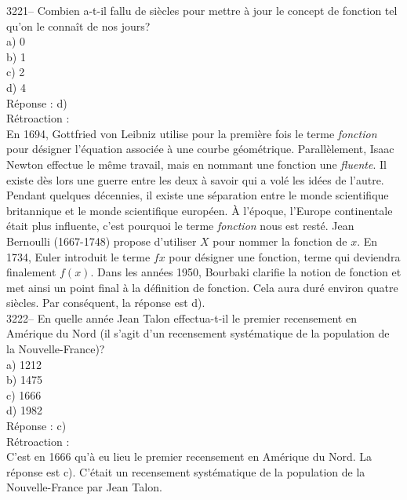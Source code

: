 \documentclass[letterpaper, 12pt]{article}
\begin{document}
3221-- Combien a-t-il fallu de si\`ecles pour mettre \`a jour le concept de fonction tel qu'on le conna\^it de nos jours?\\

a) 0\\
b) 1\\
c) 2\\
d) 4\\

R\'eponse : d)\\

R\'etroaction :\\
En 1694, Gottfried von Leibniz utilise pour la premi\`ere fois le terme \emph{fonction} pour d\'esigner l'\'equation associ\'ee \`a une courbe g\'eom\'etrique. Parall\`element, Isaac Newton effectue le m\^eme travail, mais en nommant une fonction une \emph{fluente}. Il existe d\`es lors une guerre entre les deux \`a savoir qui a vol\'e les id\'ees de l'autre. Pendant quelques d\'ecennies, il existe une s\'eparation entre le monde scientifique britannique et le monde scientifique europ\'een. \`A l'\'epoque, l'Europe continentale \'etait plus influente, c'est pourquoi le terme \emph{fonction} nous est rest\'e.  Jean Bernoulli (1667-1748) propose d'utiliser $X$ pour nommer la fonction de $x$. En 1734, Euler introduit le terme \emph{$fx$} pour d\'esigner une fonction, terme qui deviendra finalement $f(x)$. Dans les ann\'ees 1950, Bourbaki clarifie la notion de fonction et met ainsi un point final \`a la d\'efinition de fonction. Cela aura dur\'e environ quatre si\`ecles. Par cons\'equent, la r\'eponse est d).\\



3222-- En quelle ann\'ee Jean Talon effectua-t-il le premier recensement en Am\'erique du Nord (il s'agit d'un recensement syst\'ematique de la population de la Nouvelle-France)?\\

a) 1212\\
b) 1475\\
c) 1666\\
d) 1982\\

R\'eponse : c)\\

R\'etroaction :\\
C'est en 1666 qu'\`a eu lieu le premier recensement en Am\'erique du Nord. La r\'eponse est c). C'\'etait un recensement syst\'ematique de la population de la Nouvelle-France par Jean Talon.\\
\end{document}

